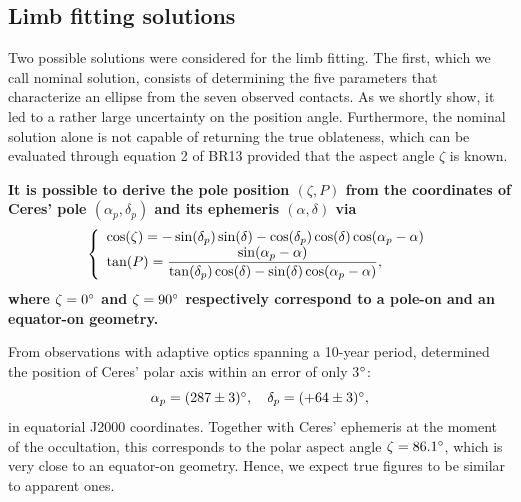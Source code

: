 \documentclass[useAMS,usenatbib]{mn2e}
\begin{document}
\subsection{Limb fitting solutions}\label{Sec: limbfitting-2010}

Two possible solutions were considered for the limb fitting. The first, which we call nominal solution, consists of determining the five parameters that characterize an ellipse from the seven observed contacts. As we shortly show, it led to a rather large uncertainty on the position angle. Furthermore, the nominal solution alone is not capable of returning the true oblateness, which can be evaluated through equation 2 of BR13  provided that the aspect angle $\zeta$ is known.%

\textbf{It is possible to derive the pole position $(\zeta, P)$ from the coordinates of Ceres' pole $(\alpha_{p}, \delta_{p})$ and its ephemeris $(\alpha, \delta)$ via}
%
\begin{equation}
\left\{
\begin{array}{l l}
\cos(\zeta)= -\sin(\delta_{p})\sin(\delta) - \cos(\delta_{p})\cos(\delta)\cos(\alpha_{p}-\alpha)\\
\tan(P) = \dfrac{\sin(\alpha_{p}-\alpha)} {\tan(\delta_{p})\cos(\delta) - \sin(\delta)\cos(\alpha_{p}-\alpha)},\\
\end{array}
\right.
\label{Eq: pole-position}
\end{equation}
%
\textbf{where $\zeta = 0\hbox{$^\circ$}$ and $\zeta=90\hbox{$^\circ$}$ respectively correspond to a pole-on and an equator-on geometry.}

From observations with adaptive optics spanning a 10-year period, \cite{Drummond2014} determined the position of Ceres' polar axis within an error of only 3$\hbox{$^\circ$}$:
\begin{equation}
\alpha_{p} = (287 \pm 3) \degr, \quad %
\delta_{p} = (+64 \pm 3) \degr,
\label{Eq: Pole}
\end{equation}
%
in equatorial J2000 coordinates. Together with Ceres' ephemeris at the moment of the occultation, this corresponds to the polar aspect angle $\zeta = 86.1\hbox{$^\circ$}$, which is very close to an equator-on geometry. Hence, we expect true figures to be similar to apparent ones.
\end{document}
